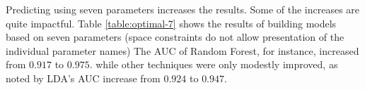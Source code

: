 \documentclass[letterpaper]{report}
\begin{document}
Predicting using seven parameters increases the results. Some of the increases are quite impactful.  Table \ref{table:optimal-7} shows the results of building models based on seven parameters (space constraints do not allow presentation of the individual  parameter names) The AUC of Random Forest, for instance, increased from $0.917$ to $0.975$. while other techniques were only modestly improved, as noted by LDA's AUC increase from $0.924$ to $0.947$. 
{


}
\end{document}

